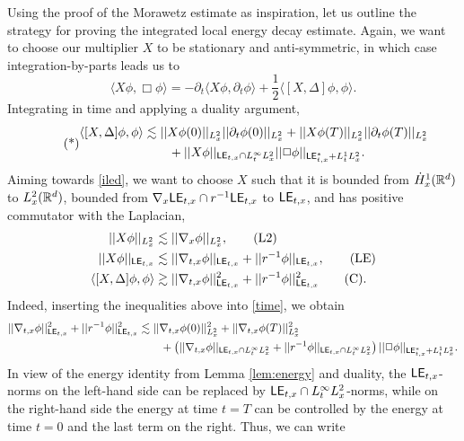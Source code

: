 Using the proof of the Morawetz estimate as inspiration, let us outline the strategy for proving the integrated local energy decay estimate. Again, we want to choose our multiplier $X$ to be stationary and anti-symmetric, in which case integration-by-parts leads us to 
	\[
		\langle X \phi, \Box \phi \rangle = - \partial_t \langle X \phi, \partial_t \phi \rangle + \frac12 \langle [X, \Delta] \phi, \phi \rangle.
	\]
Integrating in time and applying a duality argument,  
	\begin{equation}\tag{*}\label{eq:time}
		\begin{split}
		 \langle [X, \Delta] \phi, \phi \rangle 
		 	&\lesssim  ||X \phi (0)||_{L^2_x} ||\partial_t \phi (0)||_{L^2_x} +  ||X \phi (T)||_{L^2_x} ||\partial_t \phi (T)||_{L^2_x} \\
		 	&\qquad + ||X\phi||_{\mathsf{LE}_{t,x}\cap L^\infty_t L^2_x} ||\Box\phi||_{\mathsf{LE}_{t, x}^* + L^1_t L^2_x}.
		 \end{split}
	\end{equation}
Aiming towards \eqref{iled}, we want to choose $X$ such that it is bounded from $\dot H^1_x (\mathbb R^d)$ to $L^2_x (\mathbb R^d)$, bounded from $\nabla_x \mathsf{LE}_{t, x} \cap r^{-1} \mathsf{LE}_{t,x}$ to $\mathsf{LE}_{t, x}$, and has positive commutator with the Laplacian, 
	\begin{align}
		||X \phi||_{L^2_x}
			&\lesssim ||\nabla_x \phi||_{L^2_x}, \tag{L2}\label{eq:boundl2}\\
		||X \phi||_{\mathsf{LE}_{t, x}}
			&\lesssim ||\nabla_{t, x} \phi||_{\mathsf{LE}_{t, x}} + ||r^{-1} \phi||_{\mathsf{LE}_{t, x}},\tag{LE}\label{eq:boundle}\\	
		\langle [X, \Delta] \phi, \phi \rangle
			&\gtrsim ||\nabla_{t, x} \phi||_{\mathsf{LE}_{t, x}}^2 + ||r^{-1} \phi||_{\mathsf{LE}_{t, x}}^2\tag{C}\label{eq:boundpositive} .	
	\end{align}	
Indeed, inserting the inequalities above into \eqref{time}, we obtain
	\begin{align*}
		 ||\nabla_{t, x} \phi||_{\mathsf{LE}_{t, x}}^2 + ||r^{-1} \phi||_{\mathsf{LE}_{t, x}}^2 
		 	&\lesssim ||\nabla_{t, x}\phi(0)||_{L^2_x}^2 + ||\nabla_{t, x} \phi(T)||_{L^2_x}^2 \\
		 	&\qquad+ \left( ||\nabla_{t, x} \phi||_{\mathsf{LE}_{t, x} \cap L^\infty_tL^2_x} + ||r^{-1} \phi||_{\mathsf{LE}_{t, x} \cap L^\infty_t L^2_x}  \right) ||\Box \phi||_{\mathsf{LE}^*_{t, x} + L^1_t L^2_x}.
	\end{align*}
	In view of the energy identity from Lemma \ref{lem:energy} and duality, the $\mathsf{LE}_{t, x}$-norms on the left-hand side can be replaced by $\mathsf{LE}_{t, x} \cap L^\infty_t L^2_x$-norms, while on the right-hand side the energy at time $t = T$ can be controlled by the energy at time $t = 0$ and the last term on the right. Thus, we can write
